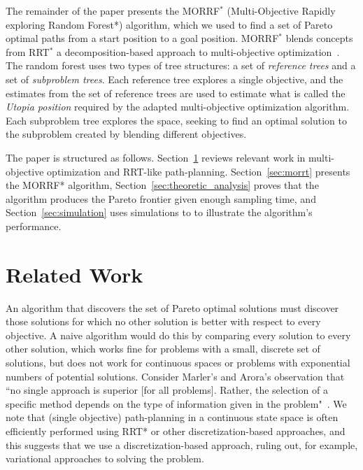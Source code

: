 \documentclass[conference]{IEEEtran}
\begin{document}
The remainder of the paper presents the MORRF$^{*}$ (Multi-Objective Rapidly exploring Random Forest*) algorithm, which we used to find a set of Pareto optimal paths from a start position to a goal position.  
MORRF$^{*}$ blends concepts from RRT$^{*}$ a decomposition-based approach to multi-objective optimization~\cite{4358754}.  
The random forest uses two types of tree structures: a set of {\em reference trees} and a set of {\em subproblem trees}.  
Each reference tree explores a single objective, and the estimates from the set of reference trees are used to estimate what is called the {\em Utopia position} required by the adapted multi-objective optimization algorithm.  
Each subproblem tree explores the space, seeking to find an optimal solution to the subproblem created by blending different objectives. 

The paper is structured as follows.  Section~\ref{sec:related_works} reviews relevant work in multi-objective optimization and RRT-like path-planning. Section~\ref{sec:morrt} presents the MORRF* algorithm,  Section~\ref{sec:theoretic_analysis} proves that the algorithm produces the Pareto frontier given enough sampling time, and Section~\ref{sec:simulation} uses simulations to to illustrate the algorithm's performance.

\section{Related Work}
\label{sec:related_works}

An algorithm that discovers the set of Pareto optimal solutions must discover those solutions for which no other solution is better with respect to every objective.  A naive algorithm would do this by comparing every solution to every other solution, which works fine for problems with a small, discrete set of solutions, but does not work for continuous spaces or problems with exponential numbers of potential solutions.  
Consider Marler's and Arora's observation that ``no single approach is superior [for all problems].  Rather, the selection of a specific method depends on the type of information given in the problem"~\cite{marler2004survey}.  We note that (single objective) path-planning in a continuous state space is often efficiently performed using RRT* or other discretization-based approaches, and this suggests that we use a discretization-based approach, ruling out, for example, variational approaches to solving the problem.    
\end{document}
